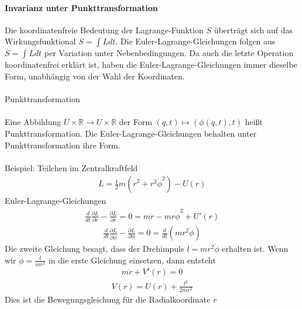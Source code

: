 \documentclass[10pt,a4paper]{article}
\begin{document}
\paragraph{Invarianz unter Punkttransformation} $\,$ \\
Die koordinatenfreie Bedeutung der Lagrange-Funktion $S$ überträgt sich auf das Wirkungsfunktional $S= \int L dt$. Die Euler-Lagrange-Gleichungen folgen aus $S=\int L dt $ per Variation unter Nebenbedingungen. Da auch die letzte Operation koordinatenfrei erklärt ist, haben die Euler-Lagrange-Gleichungen immer dieselbe Form, unabhängig von der Wahl der Koordinaten.\\
\\
Punkttransformation\\
\\
Eine Abbildung $ U \times \mathbb{R} \longrightarrow U \times \mathbb{R}$ der Form $ (q,t) \longmapsto ( \phi (q,t),t)$ heißt Punkttransformation. Die Euler-Lagrange-Gleichungen behalten unter Punkttransformation ihre Form.\\
\\
Beispiel: Teilchen im Zentralkraftfeld
\begin{align}
L=\frac{1}{2} m (\dot{r}^2+r^2\dot{\phi}^2)-U(r)
\end{align}
Euler-Lagrange-Gleichungen
\begin{align}
\frac{d}{dt} \frac{\partial L}{\partial \dot{r}}-\frac{\partial L}{\partial r}=0=m \ddot{r}-mr\dot{\phi}^2+U'(r)
\end{align}
\begin{align}
\frac{d}{dt} \frac{\partial L}{\partial \dot{\phi}}-\frac{\partial L}{\partial
	\phi} =0=\frac{d}{dt}(mr^2 \dot{\phi})
\end{align}
Die zweite Gleichung besagt, dass der Drehimpuls $l=mr^2\dot{\phi} $ erhalten ist. Wenn wir $ \dot{\phi}=\frac{l}{mr^2}$ in die erste Gleichung einsetzen, dann entsteht
\begin{align}
m \ddot{r}+V'(r) =0
\end{align}
\begin{align}
V(r)=U(r)+ \frac{l^2}{2mr^2}
\end{align}
Dies ist die Bewegungsgleichung für die Radialkoordinate $r$
\end{document}
